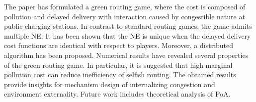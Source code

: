\documentclass[letterpaper, 10 pt, conference]{ieeeconf}  %
\begin{document}
The paper has formulated a green routing game, where the cost is composed of pollution and delayed delivery with interaction caused by congestible nature at public charging stations.
In contrast to standard routing games, the game admits multiple NE.
It has been shown that the NE is unique when the delayed delivery cost functions are identical with respect to players.
Moreover, a distributed algorithm has been proposed.
Numerical results have revealed several properties of the green routing game.
In particular, it is suggested that high marginal pollution cost can reduce inefficiency of selfish routing.
The obtained results provide insights for mechanism design of internalizing congestion and environment externality.
Future work includes theoretical analysis of PoA.


\end{document}
